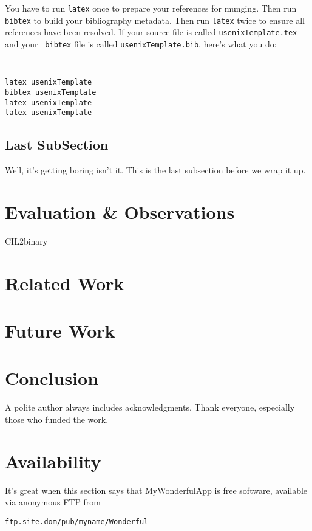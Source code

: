 \documentclass[letterpaper,twocolumn,10pt]{article}
\begin{document}
You have to run {\tt latex} once to prepare your references for
munging.  Then run {\tt bibtex} to build your bibliography metadata.
Then run {\tt latex} twice to ensure all references have been resolved.
If your source file is called {\tt usenixTemplate.tex} and your {\tt
  bibtex} file is called {\tt usenixTemplate.bib}, here's what you do:
{\tt \small
\begin{verbatim}
latex usenixTemplate
bibtex usenixTemplate
latex usenixTemplate
latex usenixTemplate
\end{verbatim}
}


\subsection{Last SubSection}

Well, it's getting boring isn't it.  This is the last subsection
before we wrap it up.

\section{Evaluation \& Observations}CIL2binary

\section{Related Work}

\section{Future Work}

\section{Conclusion}

A polite author always includes acknowledgments.  Thank everyone,
especially those who funded the work. 

\section{Availability}

It's great when this section says that MyWonderfulApp is free software, 
available via anonymous FTP from

\begin{center}
{\tt ftp.site.dom/pub/myname/Wonderful}\\
\end{center}
\end{document}
